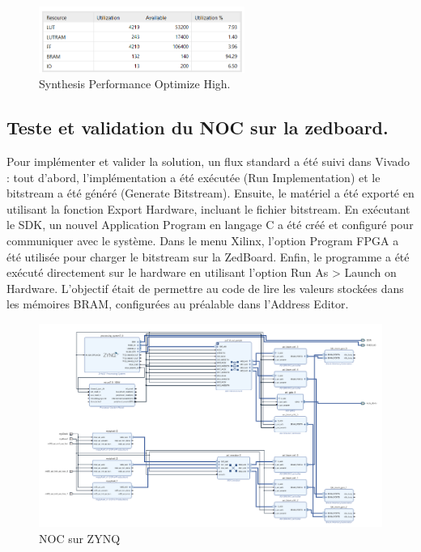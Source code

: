 \documentclass[../CSC_5RO07_TA.tex]{subfiles}
\begin{document}
\begin{figure}[H]
    \centering
    \includegraphics[width=0.6\textwidth]{./images/performance optimize high.png}
    \caption{Synthesis Performance Optimize High.}
\end{figure}

\subsection{Teste et validation du NOC sur la zedboard.}

Pour implémenter et valider la solution, un flux standard a été suivi dans Vivado : tout d'abord, l'implémentation a été exécutée (Run Implementation) et le bitstream a été généré (Generate Bitstream). Ensuite, le matériel a été exporté en utilisant la fonction Export Hardware, incluant le fichier bitstream. En exécutant le SDK, un nouvel Application Program en langage C a été créé et configuré pour communiquer avec le système. Dans le menu Xilinx, l'option Program FPGA a été utilisée pour charger le bitstream sur la ZedBoard. Enfin, le programme a été exécuté directement sur le hardware en utilisant l'option Run As > Launch on Hardware. L'objectif était de permettre au code de lire les valeurs stockées dans les mémoires BRAM, configurées au préalable dans l'Address Editor.


\begin{figure}[H]
    \centering
    \includegraphics[width=1\textwidth]{./images/NOCZYNQ.png}
    \caption{NOC sur ZYNQ}
\end{figure}
\end{document}

